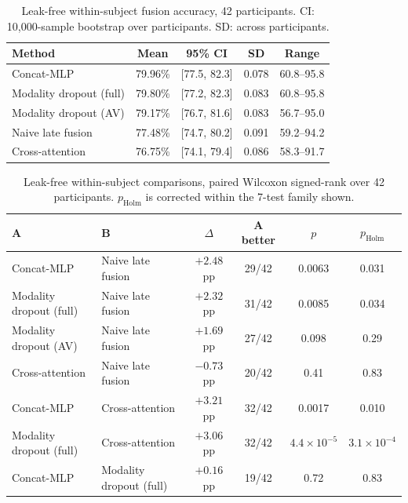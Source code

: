 \begin{table}[htbp]
\centering
\small
\caption{Leak-free within-subject fusion accuracy, 42 participants. CI: 10{,}000-sample bootstrap over participants. SD: across participants.}
\label{tab:within_means}
\begin{tabular}{lcccc}
\hline
\textbf{Method} & \textbf{Mean} & \textbf{95\% CI} & \textbf{SD} & \textbf{Range} \\
\hline
Concat-MLP              & 79.96\% & [77.5, 82.3] & 0.078 & 60.8--95.8 \\
Modality dropout (full) & 79.80\% & [77.2, 82.3] & 0.083 & 60.8--95.8 \\
Modality dropout (AV)   & 79.17\% & [76.7, 81.6] & 0.083 & 56.7--95.0 \\
Naive late fusion       & 77.48\% & [74.7, 80.2] & 0.091 & 59.2--94.2 \\
Cross-attention         & 76.75\% & [74.1, 79.4] & 0.086 & 58.3--91.7 \\
\hline
\end{tabular}
\end{table}

\begin{table}[htbp]
\centering
\small
\caption{Leak-free within-subject comparisons, paired Wilcoxon signed-rank over 42 participants. $p_{\mathrm{Holm}}$ is corrected within the 7-test family shown.}
\label{tab:within_tests}
\begin{tabular}{llcccc}
\hline
\textbf{A} & \textbf{B} & \textbf{$\Delta$} & \textbf{A better} & \textbf{$p$} & \textbf{$p_{\mathrm{Holm}}$} \\
\hline
Concat-MLP              & Naive late fusion & $+2.48$ pp & 29/42 & 0.0063 & 0.031 \\
Modality dropout (full) & Naive late fusion & $+2.32$ pp & 31/42 & 0.0085 & 0.034 \\
Modality dropout (AV)   & Naive late fusion & $+1.69$ pp & 27/42 & 0.098  & 0.29 \\
Cross-attention         & Naive late fusion & $-0.73$ pp & 20/42 & 0.41   & 0.83 \\
\hline
Concat-MLP              & Cross-attention   & $+3.21$ pp & 32/42 & 0.0017 & 0.010 \\
Modality dropout (full) & Cross-attention   & $+3.06$ pp & 32/42 & $4.4\times10^{-5}$ & $3.1\times10^{-4}$ \\
Concat-MLP              & Modality dropout (full) & $+0.16$ pp & 19/42 & 0.72 & 0.83 \\
\hline
\end{tabular}
\end{table}

